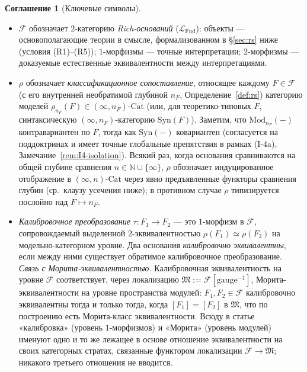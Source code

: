 \documentclass[11pt]{article}
\theoremstyle{plain}
\theoremstyle{definition}
\newtheorem{convention}[theorem]{Соглашение}
\newcommand{\cF}{\mathcal{F}}
\newcommand{\fM}{\mathfrak{M}}
\newcommand{\LFnd}{\mathcal{L}_{\mathrm{Fnd}}}
\newcommand{\Cat}{\mathrm{Cat}}
\newcommand{\Syn}{\mathrm{Syn}}
\newcommand{\Mod}{\mathrm{Mod}}
\begin{document}
\begin{convention}[Ключевые символы]\label{conv:notation}
\begin{itemize}
\item $\cF$ обозначает $2$-категорию \emph{Rich-оснований} ($\LFnd$): объекты — основополагающие теории в смысле, формализованном в \S\ref{sec:rs} ниже (условия (R1)--(R5)); $1$-морфизмы — точные интерпретации; $2$-морфизмы — доказуемые естественные эквивалентности между интерпретациями.
\item $\rho$ обозначает \emph{классификационное сопоставление}, относящее каждому $F \in \cF$ (с его внутренней необратимой глубиной $n_F$, Определение~\ref{def:rs}) категорию моделей $\rho_{n_F}(F) \in (\infty, n_F)\text{-}\Cat$ (или, для теоретико-типовых $F$, синтаксическую $(\infty, n_F)$-категорию $\Syn(F)$). Заметим, что $\Mod_{n_F}(-)$ контравариантен по $F$, тогда как $\Syn(-)$ ковариантен (согласуется на поддоктринах и имеет точные глобальные препятствия в рамках \textup{(I-4a)}, Замечание~\ref{rem:I4-isolation}). Всякий раз, когда основания сравниваются на общей глубине сравнения $n \in \mathbb{N} \cup \{\infty\}$, $\rho$ обозначает индуцированное отображение в $(\infty, n)\text{-}\Cat$ через явно предъявленные функторы сравнения глубин (ср.\ клаузу усечения ниже); в противном случае $\rho$ типизируется послойно над $F \mapsto n_F$.
\item \emph{Калибровочное преобразование} $\tau : F_1 \to F_2$ — это $1$-морфизм в $\cF$, сопровождаемый выделенной $2$-эквивалентностью $\rho(F_1) \simeq \rho(F_2)$ на модельно-категорном уровне. Два основания \emph{калибровочно эквивалентны}, если между ними существует обратимое калибровочное преобразование. \emph{Связь с Морита-эквивалентностью.} Калибровочная эквивалентность на уровне $\cF$ соответствует, через локализацию $\fM := \cF[\mathrm{gauge}^{-1}]$, Морита-эквивалентности на уровне пространства модулей: $F_1, F_2 \in \cF$ калибровочно эквивалентны тогда и только тогда, когда $[F_1] = [F_2]$ в $\fM$, что по построению есть Морита-класс эквивалентности. Всюду в статье «калибровка» (уровень $1$-морфизмов) и «Морита» (уровень модулей) именуют одно и то же лежащее в основе отношение эквивалентности на своих категорных стратах, связанные функтором локализации $\cF \to \fM$; никакого третьего отношения не вводится.

\end{itemize}
\end{convention}
\end{document}
